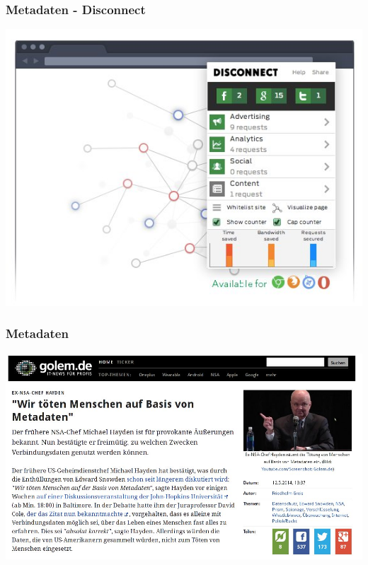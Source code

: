 \documentclass[12pt]{beamer}
\begin{document}
\begin{frame}
  \frametitle{Metadaten - Disconnect}
  \begin{center}
	\includegraphics[height=0.7\textheight]{img/disconnectme.jpg}
  \end{center}
\end{frame}

\begin{frame}
    \frametitle{Metadaten}
    \begin{center}
	\includegraphics[height=0.7\textheight]{img/wekillpeople.jpg}
    \end{center}
\end{frame}

\end{document}
